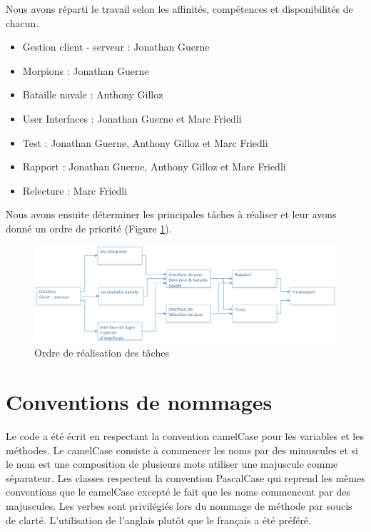 \documentclass{report}
\begin{document}
Nous avons réparti le travail selon les affinités, compétences et disponibilités de chacun.
\par
\begin{itemize}
	\item Gestion client - serveur : Jonathan Guerne
	\item Morpions : Jonathan Guerne
	\item Bataille navale : Anthony Gilloz
	\item User Interfaces : Jonathan Guerne et Marc Friedli
	\item Test : Jonathan Guerne, Anthony Gilloz et Marc Friedli
	\item Rapport : Jonathan Guerne, Anthony Gilloz et Marc Friedli
	\item Relecture : Marc Friedli
\end{itemize}
\par
Nous avons ensuite déterminer les principales tâches à réaliser et leur avons donné un ordre de priorité (Figure \ref{planif}).

\begin{figure}[H]
	\centering\includegraphics[width=15cm]{Planif}
	\caption{Ordre de réalisation des tâches}
	\label{planif}
\end{figure}

\chapter{Conventions de nommages}
Le code a été écrit en respectant la convention camelCase pour les variables et
les méthodes. Le camelCase consiste à commencer les noms par des minuscules et si
le nom est une composition de plusieurs mots utiliser une majuscule comme séparateur.
Les classes respectent la convention PascalCase qui reprend les mêmes conventions que
le camelCase excepté le fait que les noms commencent par des majuscules.
Les verbes sont privilégiés lors du nommage de méthode par soucis de clarté.
L’utilisation de l’anglais plutôt que le français a été préféré.
\end{document}
